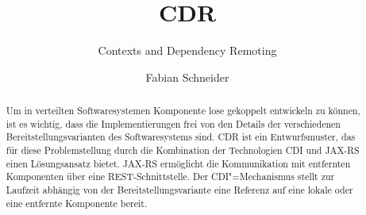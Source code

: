 \documentclass[german,a4paper]{llncs}
\begin{document}
\title{CDR}															%
\subtitle{Contexts and Dependency Remoting}							%
\author{Fabian Schneider}					    						%
           
\maketitle

\begin{acronym}
\end{acronym}

\begin{abstract}
Um in verteilten Softwaresystemen Komponente lose gekoppelt entwickeln zu können, ist es wichtig, dass die Implementierungen frei von den Details der verschiedenen Bereitstellungsvarianten des Softwaresystems sind. 
\ac{CDR} ist ein Entwurfsmuster, das für diese Problemstellung durch die Kombination der Technologien \ac{CDI} und \ac{JAX-RS} einen Lösungsansatz bietet. 
\ac{JAX-RS} ermöglicht die Kommunikation mit entfernten Komponenten über eine \ac{REST}-Schnittstelle. 
Der \ac{CDI}"=Mechanismus stellt zur Laufzeit abhängig von der Bereitstellungsvariante eine Referenz auf eine lokale oder eine entfernte Komponente bereit.
\end{abstract}








\vspace{-20pt}

%

\end{document}
